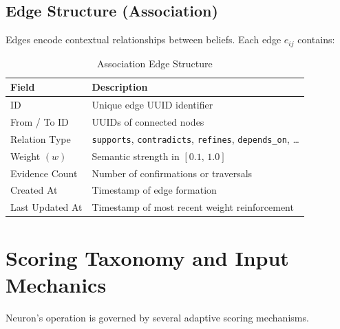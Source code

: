 \documentclass[11pt,a4paper]{article}
\begin{document}
\subsection{Edge Structure (Association)}

Edges encode contextual relationships between beliefs. Each edge $e_{ij}$ contains:

\begin{table}[h!]
\centering
\caption{Association Edge Structure}
\begin{tabular}{@{} p{4.2cm} p{8.8cm} @{}}
    \toprule
    \textbf{Field}     & \textbf{Description}                                      \\
    \midrule
    ID                 & Unique edge UUID identifier                               \\
    From / To ID       & UUIDs of connected nodes                                  \\
    Relation Type      & \texttt{supports}, \texttt{contradicts},
                         \texttt{refines}, \texttt{depends\_on}, \ldots          \\
    Weight $(w)$       & Semantic strength in $[0.1,\,1.0]$                        \\
    Evidence Count     & Number of confirmations or traversals                     \\
    Created At         & Timestamp of edge formation                               \\
    Last Updated At    & Timestamp of most recent weight reinforcement             \\
    \bottomrule
\end{tabular}
\end{table}

\section{Scoring Taxonomy and Input Mechanics}

Neuron's operation is governed by several adaptive scoring mechanisms.
\end{document}
